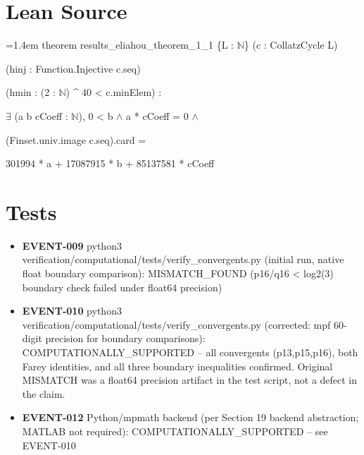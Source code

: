\documentclass[11pt]{article}
\begin{document}
\section{Lean Source}
{\footnotesize\ttfamily\raggedright\hangindent=1.4em\noindent
\hspace*{0.00em}theorem results\_\allowbreak{}eliahou\_\allowbreak{}theorem\_\allowbreak{}1\_\allowbreak{}1 \{L : \ensuremath{\mathbb{N}}\} (c : CollatzCycle L)\par
\hspace*{2.20em}(hinj : Function.\allowbreak{}Injective c.\allowbreak{}seq)\par
\hspace*{2.20em}(hmin : (2 : \ensuremath{\mathbb{N}}) \textasciicircum{} 40 < c.\allowbreak{}minElem) :\par
\hspace*{2.20em}\ensuremath{\exists} (a b cCoeff : \ensuremath{\mathbb{N}}), 0 < b \ensuremath{\wedge} a * cCoeff = 0 \ensuremath{\wedge}\par
\hspace*{3.30em}(Finset.\allowbreak{}univ.\allowbreak{}image c.\allowbreak{}seq).\allowbreak{}card =\par
\hspace*{4.40em}301994 * a + 17087915 * b + 85137581 * cCoeff\par
}

\section{Tests}
\begin{itemize}
\item \textbf{EVENT-009} python3 verification/computational/tests/verify\_convergents.py (initial run, native float boundary comparison): MISMATCH\_FOUND (p16/q16 < log2(3) boundary check failed under float64 precision)
\item \textbf{EVENT-010} python3 verification/computational/tests/verify\_convergents.py (corrected: mpf 60-digit precision for boundary comparisons): COMPUTATIONALLY\_SUPPORTED -- all convergents (p13,p15,p16), both Farey identities, and all three boundary inequalities confirmed. Original MISMATCH was a float64 precision artifact in the test script, not a defect in the claim.
\item \textbf{EVENT-012} Python/mpmath backend (per Section 19 backend abstraction; MATLAB not required): COMPUTATIONALLY\_SUPPORTED -- see EVENT-010
\end{itemize}
\end{document}
